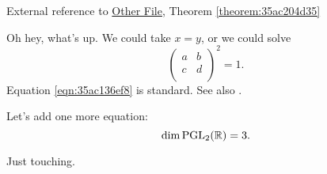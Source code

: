 \documentclass[reqno]{amsart} 
\begin{document}
External reference to \href{test2.pdf}{Other File}, Theorem \ref{theorem:35ac204d35}

Oh hey, what's up.  We could take $x = y$, or we could solve
\begin{equation}\label{eqn:35ac136ef8}
  \begin{pmatrix}
    a & b \\
    c & d \\
  \end{pmatrix}^2 = 1.
\end{equation}
Equation \eqref{eqn:35ac136ef8} is standard.  See also \cite{2021arXiv210915230N}.

Let's add one more equation:
\begin{equation*}
\dim \operatorname{PGL}_2(\mathbb{R}) = 3.
\end{equation*}

Just touching.



{} 
\end{document}
